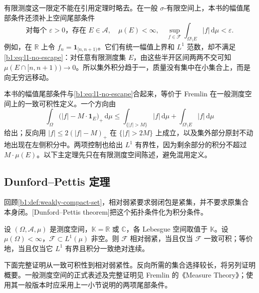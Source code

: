 \ProseParagraphBreak

有限测度这一限定不能在引用定理时略去。在一般 \(\sigma\)-有限空间上，本书的幅值尾部条件还须补上空间尾部条件
\begin{equation}
\label{b1:eq:l1-no-escape}
  \text{对每个 }\varepsilon>0\text{，存在 }E\in\mathcal A,
  \quad\mu(E)<\infty,\quad
  \sup_{f\in\mathcal F}\int_{\Omega\setminus E}|f|\,\mathrm d\mu
  <\varepsilon.
\end{equation}
例如，在 \(\mathbb R\) 上令 \(f_n=\mathbf1_{[n,n+1)}\)。它们有统一幅值上界和 \(L^1\) 范数，却不满足\eqref{b1:eq:l1-no-escape}：对任意有限测度集 \(E\)，由这些半开区间两两不交可知 \(\mu(E\cap[n,n+1))\to0\)。所以集外积分趋于一，质量没有集中在小集合上，而是向无穷远移动。

\ProseParagraphBreak

本书的幅值尾部条件与\eqref{b1:eq:l1-no-escape}合起来，等价于 Fremlin 在一般测度空间上的一致可积性定义\cite[Volume 2, 246A]{Fremlin2016Measure}。一个方向由
\[
  \int_\Omega\bigl(|f|-M\cdot\mathbf1_E\bigr)_+\,\mathrm d\mu
  \leq\int_{\{|f|>M\}}|f|\,\mathrm d\mu
       +\int_{\Omega\setminus E}|f|\,\mathrm d\mu
\]
给出；反向用 \(|f|\leq2(|f|-M)_+\) 在 \(\{|f|>2M\}\) 上成立，以及集外部分原封不动地出现在左侧积分中。两项控制也给出 \(L^1\) 有界性，因为剩余部分的积分不超过 \(M\cdot\mu(E)\)。以下主定理先只在有限测度空间陈述，避免混用定义。

\subsection{Dunford–Pettis 定理}
\label{b1:subsec:100502}

回顾\cref{b1:def:weakly-compact-set}，相对弱紧要求弱闭包是紧集，并不要求原集合本身闭。[Dunford--Pettis theorem]把这个拓扑条件化为积分条件。

\begin{theorem}
\label{b1:thm:dunford-pettis}
设 \((\Omega,\mathcal A,\mu)\) 是测度空间，\(\mathbb K=\mathbb R\) 或 \(\mathbb C\)，各 Lebesgue 空间取值于 \(\mathbb K\)。设 \(\mu(\Omega)<\infty\)，\(\mathcal F\subset L^1(\mu)\) 非空。则 \(\mathcal F\) 相对弱紧，当且仅当 \(\mathcal F\) 一致可积；等价地，当且仅当它 \(L^1\) 有界且积分一致绝对连续。
\end{theorem}

下面完整证明从一致可积性到相对弱紧性。反向所需的集合选择较长，将另列证明概要。一般测度空间的正式表述及完整证明见 Fremlin 的《Measure Theory》\cite[Volume 2, 247C; complex case, 247E]{Fremlin2016Measure}；使用其一般版本时应采用上一小节说明的两项尾部条件。

